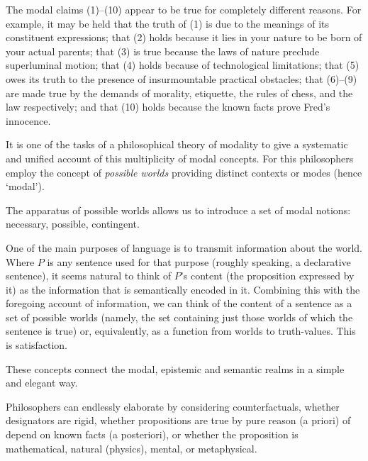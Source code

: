 \pn The modal claims (1)–(10) appear to be true for completely different reasons. For example, it may be held that the truth of (1) is due to the meanings of its constituent expressions; that (2) holds because it lies in your nature to be born of your actual parents; that (3) is true because the laws of nature preclude superluminal motion; that (4) holds because of technological limitations; that (5) owes its truth to the presence of insurmountable practical obstacles; that (6)–(9) are made true by the demands of morality, etiquette, the rules of chess, and the law respectively; and that (10) holds because the known facts prove Fred’s innocence.

\pn It is one of the tasks of a philosophical theory of modality to give a systematic and unified account of this multiplicity of modal concepts.
For this philosophers employ the concept of \emph{possible worlds} providing distinct contexts or modes (hence `modal').

\pn The apparatus of possible worlds allows us to introduce a set of modal notions:  necessary, possible, contingent.

\pn One of the main purposes of language is to transmit information about the world. Where 
$P$
 is any sentence used for that purpose (roughly speaking, a declarative sentence), it seems natural to think of 
$P$’s content (the proposition expressed by it) as the information that is semantically encoded in it. Combining this with the foregoing account of information, we can think of the content of a sentence as a set of possible worlds (namely, the set containing just those worlds of which the sentence is true) or, equivalently, as a function from worlds to truth-values.  This is satisfaction.


\pn These concepts connect the modal, epistemic and semantic realms in a simple and elegant way.  

\pn Philosophers can endlessly elaborate  by considering counterfactuals, whether designators are rigid, whether propositions are true by pure reason (a priori) of depend on known facts (a posteriori), or whether the proposition is mathematical, natural (physics), mental, or metaphysical.

